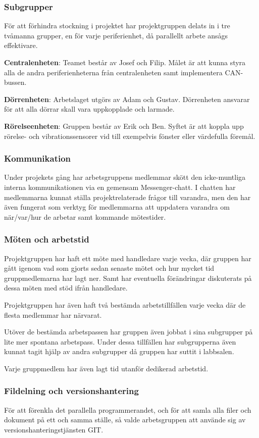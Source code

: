 \documentclass{article}
\begin{document}
\subsubsection{Subgrupper}
För att förhindra stockning i projektet har projektgruppen delats in i tre tvåmanna grupper, en för varje periferienhet, då parallellt arbete ansågs effektivare.

\textbf{Centralenheten}: Teamet består av Josef och Filip. Målet är att kunna styra alla de andra periferienheterna från centralenheten samt implementera CAN-bussen.

\textbf{Dörrenheten}: Arbetslaget utgörs av Adam och Gustav. Dörrenheten ansvarar för att alla dörrar skall vara uppkopplade och larmade.

\textbf{Rörelseenheten}: Gruppen består av Erik och Ben. Syftet är att koppla upp rörelse- och vibrationssensorer vid till exempelvis fönster eller värdefulla föremål.

\subsubsection{Kommunikation}
Under projekets gång har arbetsgruppens medlemmar skött den icke-muntliga
interna kommunikationen via en gemensam Messenger-chatt.
I chatten har medlemmarna kunnat ställa projektrelaterade
frågor till varandra, men den har även fungerat som verktyg
 för medlemmarna att uppdatera varandra om när/var/hur de
 arbetar samt kommande mötestider.
\subsubsection{Möten och arbetstid}
Projektgruppen har haft ett möte med handledare varje vecka, där
gruppen har gått igenom vad som gjorts sedan senaste mötet och hur
mycket tid gruppmedlemarna har lagt ner. Samt har eventuella förändringar
diskuterats på dessa möten med stöd ifrån handledare.

Projektgruppen har även haft två bestämda arbetstillfällen varje
vecka där de flesta medlemmar har närvarat.

Utöver de bestämda arbetspassen har gruppen även
jobbat i sina subgrupper på lite mer spontana arbetspass. Under
dessa tillfällen har subgrupperna även kunnat tagit hjälp av
andra subgrupper då gruppen har suttit i labbsalen.

Varje gruppmedlem har även lagt tid utanför dedikerad arbetstid.

\subsubsection{Fildelning och versionshantering}
För att förenkla det parallella programmerandet, och för att samla alla filer och dokument
på ett och samma ställe, så valde arbetsgruppen att använde sig av versionshanteringstjänsten GIT.
\end{document}
